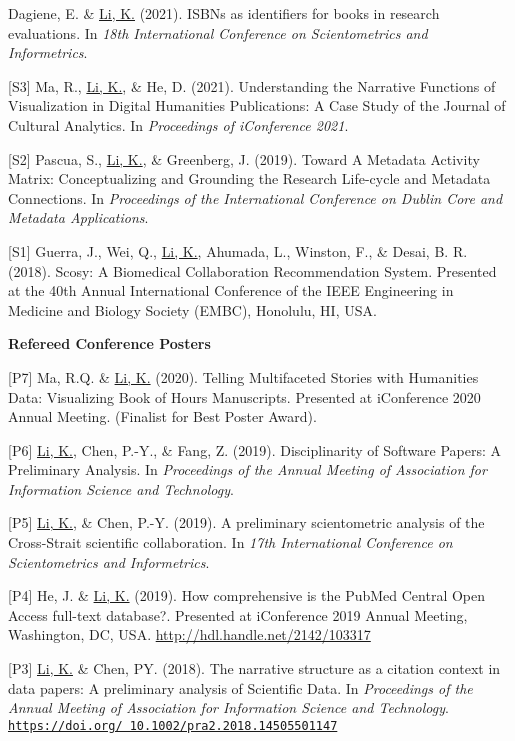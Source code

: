 \documentclass[margin, 10pt]{res} %
\begin{document}
\begin{resume}
[S4] Dagiene, E. \& \underline{Li, K.} (2021). ISBNs as identifiers for books in research evaluations. In \textit{18th International Conference on Scientometrics and Informetrics}.

[S3] Ma, R., \underline{Li, K.}, \& He, D. (2021). Understanding the Narrative Functions of Visualization in Digital Humanities Publications: A Case Study of the Journal of Cultural Analytics. In \textit{Proceedings of iConference 2021}.

[S2] Pascua, S., \underline{Li, K.}, \& Greenberg, J. (2019). Toward A Metadata Activity Matrix: Conceptualizing and Grounding the Research Life-cycle and Metadata Connections. In \textit{Proceedings of the International Conference on Dublin Core and Metadata Applications}.

[S1] Guerra, J., Wei, Q., \underline{Li, K.}, Ahumada, L., Winston, F., \& Desai, B. R. (2018). Scosy: A Biomedical Collaboration Recommendation System. Presented at the 40th Annual International Conference of the IEEE Engineering in Medicine and Biology Society (EMBC), Honolulu, HI, USA.

\textbf{Refereed Conference Posters}

[P7] Ma, R.Q. \& \underline{Li, K.} (2020). Telling Multifaceted Stories with Humanities Data: Visualizing Book of Hours Manuscripts. Presented at iConference 2020 Annual Meeting. (Finalist for Best Poster Award).

[P6] \underline{Li, K.}, Chen, P.-Y., \& Fang, Z. (2019). Disciplinarity of Software Papers: A Preliminary Analysis. In \textit{Proceedings of the Annual Meeting of Association for Information Science and Technology}.

[P5] \underline{Li, K.}, \& Chen, P.-Y. (2019). A preliminary scientometric analysis of the Cross-Strait scientific collaboration. In \textit{17th International Conference on Scientometrics and Informetrics}.

[P4] He, J. \& \underline{Li, K.} (2019). How comprehensive is the PubMed Central Open Access full-text database?. Presented at iConference 2019 Annual Meeting, Washington, DC, USA. \href{http://hdl.handle.net/2142/103317}{http://hdl.handle.net/2142/103317}

[P3] \underline{Li, K.} \& Chen, PY. (2018). The narrative structure as a citation context in data papers: A preliminary analysis of Scientific Data. In \textit{Proceedings of the Annual Meeting of Association for Information Science and Technology}. \href{https://doi.org/10.1002/pra2.2018.14505501147}{\nolinkurl{https://doi.org/ 10.1002/pra2.2018.14505501147}}


\end{resume}
\end{document}
